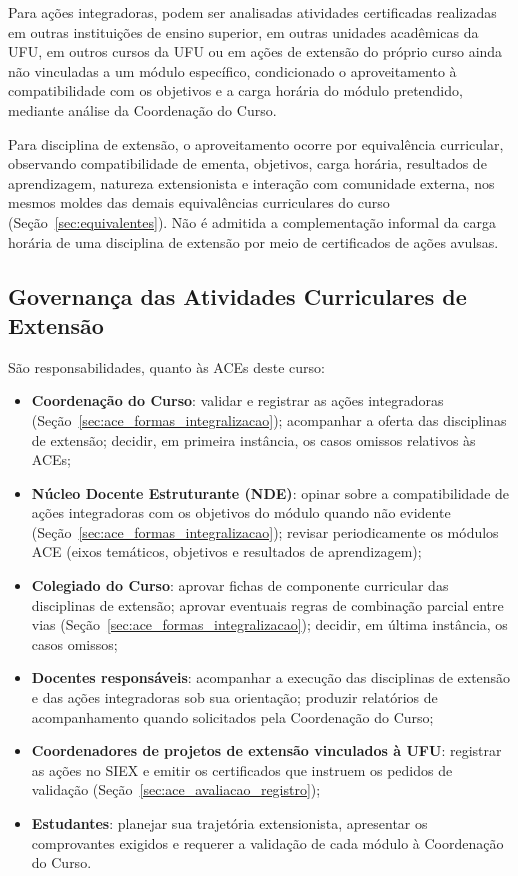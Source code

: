 Para ações integradoras, podem ser analisadas atividades certificadas realizadas em outras instituições de ensino superior, em outras unidades acadêmicas da UFU, em outros cursos da UFU ou em ações de extensão do próprio curso ainda não vinculadas a um módulo específico, condicionado o aproveitamento à compatibilidade com os objetivos e a carga horária do módulo pretendido, mediante análise da Coordenação do Curso.

Para disciplina de extensão, o aproveitamento ocorre por equivalência curricular, observando compatibilidade de ementa, objetivos, carga horária, resultados de aprendizagem, natureza extensionista e interação com comunidade externa, nos mesmos moldes das demais equivalências curriculares do curso (Seção~\ref{sec:equivalentes}\unskip). Não é admitida a complementação informal da carga horária de uma disciplina de extensão por meio de certificados de ações avulsas.

\subsection{Governança das Atividades Curriculares de Extensão}
\label{sec:ace_governanca}

São responsabilidades, quanto às ACEs deste curso:

\begin{itemize}
    \item \textbf{Coordenação do Curso}: validar e registrar as ações integradoras (Seção~\ref{sec:ace_formas_integralizacao}\unskip); acompanhar a oferta das disciplinas de extensão; decidir, em primeira instância, os casos omissos relativos às ACEs;
    \item \textbf{Núcleo Docente Estruturante (NDE)}: opinar sobre a compatibilidade de ações integradoras com os objetivos do módulo quando não evidente (Seção~\ref{sec:ace_formas_integralizacao}\unskip); revisar periodicamente os módulos ACE (eixos temáticos, objetivos e resultados de aprendizagem);
    \item \textbf{Colegiado do Curso}: aprovar fichas de componente curricular das disciplinas de extensão; aprovar eventuais regras de combinação parcial entre vias (Seção~\ref{sec:ace_formas_integralizacao}\unskip); decidir, em última instância, os casos omissos;
    \item \textbf{Docentes responsáveis}: acompanhar a execução das disciplinas de extensão e das ações integradoras sob sua orientação; produzir relatórios de acompanhamento quando solicitados pela Coordenação do Curso;
    \item \textbf{Coordenadores de projetos de extensão vinculados à UFU}: registrar as ações no SIEX e emitir os certificados que instruem os pedidos de validação (Seção~\ref{sec:ace_avaliacao_registro}\unskip);
    \item \textbf{Estudantes}: planejar sua trajetória extensionista, apresentar os comprovantes exigidos e requerer a validação de cada módulo à Coordenação do Curso.
\end{itemize}

